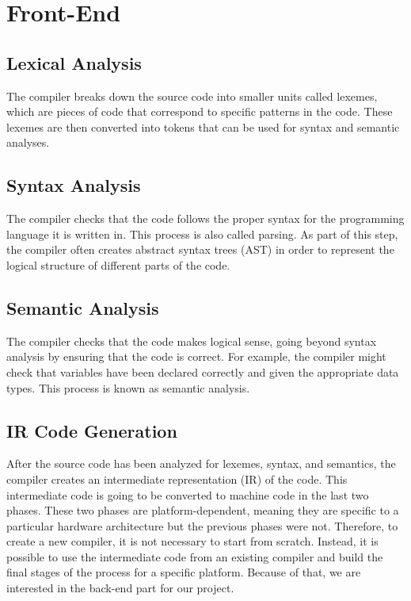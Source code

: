 \section{Front-End}

\subsection{Lexical Analysis}
The compiler breaks down the source code into smaller units called lexemes, which are pieces of code that correspond to specific patterns in the code. These lexemes are then converted into tokens that can be used for syntax and semantic analyses.

\subsection{Syntax Analysis}
The compiler checks that the code follows the proper syntax for the programming language it is written in. This process is also called parsing. As part of this step, the compiler often creates abstract syntax trees (AST) in order to represent the logical structure of different parts of the code.

\subsection{Semantic Analysis}
The compiler checks that the code makes logical sense, going beyond syntax analysis by ensuring that the code is correct. For example, the compiler might check that variables have been declared correctly and given the appropriate data types. This process is known as semantic analysis.

\subsection{IR Code Generation}
After the source code has been analyzed for lexemes, syntax, and semantics, the compiler creates an intermediate representation (IR) of the code.
This intermediate code is going to be converted to machine code in the last two phases. These two phases are platform-dependent, meaning they are specific to a particular hardware architecture but the previous phases were not. Therefore, to create a new compiler, it is not necessary to start from scratch. Instead, it is possible to use the intermediate code from an existing compiler and build the final stages of the process for a specific platform. Because of that, we are interested in the back-end part for our project.

